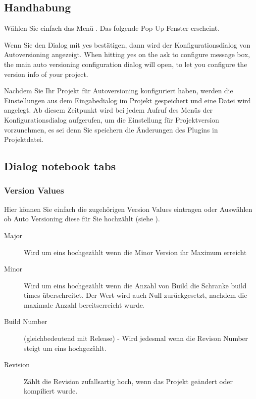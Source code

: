 \subsection{Handhabung}

Wählen Sie einfach das Menü . Das folgende Pop Up Fenster erscheint.


Wenn Sie den Dialog mit yes bestätigen, dann wird der Konfigurationsdialog von Autoversioning angezeigt.
When hitting yes on the ask to configure message box, the main auto versioning configuration dialog will open, to let you configure the version info of your project.

Nachdem Sie Ihr Projekt für Autoversioning konfiguriert haben, werden die Einstellungen aus dem Eingabedialog im Projekt gespeichert und eine Datei  wird angelegt. Ab diesem Zeitpunkt wird bei jedem Aufruf des Menüs  der Konfigurationsdialog aufgerufen, um die Einstellung für Projektversion vorzunehmen, es sei denn Sie speichern die Änderungen des Plugins in Projektdatei.

\subsection{Dialog notebook tabs}
\subsubsection{Version Values}

Hier können Sie einfach die zugehörigen Version Values eintragen oder Auswählen ob Auto Versioning diese für Sie hochzählt (siehe ).

\begin{description}
\item[Major] Wird um eins hochgezählt wenn die Minor Version ihr Maximum erreicht
\item[Minor] Wird um eins hochgezählt wenn die Anzahl von Build die Schranke build times überschreitet. Der Wert wird auch Null zurückgesetzt, nachdem die maximale Anzahl bereitserreicht wurde.
\item[Build Number] (gleichbedeutend mit Release) - Wird jedesmal wenn die Revison Number steigt um eins hochgezählt.
\item[Revision] Zählt die Revision zufallsartig hoch, wenn das Projekt geändert oder kompiliert wurde.
\end{description}

